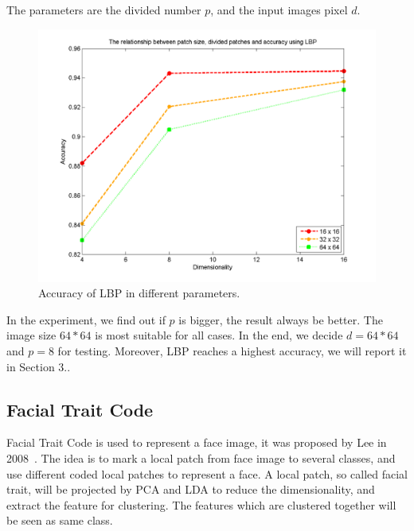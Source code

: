 \documentclass[10pt,twocolumn,letterpaper]{article}
\begin{document}
The parameters are the divided number $p$, and the input images pixel $d$.

\begin{figure}[t]
    \begin{center}
        \includegraphics[width=0.8\linewidth]{fig/lbp/lbp_par.png}
    \end{center}
    \caption{Accuracy of LBP in different parameters.}
    \label{fig:lbp_par}
\end{figure}

In the experiment, we find out if $p$ is bigger, the result always be better.
The image size $64*64$ is most suitable for all cases. In the end, we decide
$d=64*64$ and $p=8$ for testing. Moreover, LBP reaches a highest accuracy, 
we will report it in Section 3..


\subsection{Facial Trait Code}
Facial Trait Code is used to represent a face image, it was proposed
by Lee \etal in 2008~\cite{Lee2008}. The idea is to mark a local patch from face image
to several classes, and use different coded local patches to represent a face.
A local patch, so called facial trait, will be projected by PCA and LDA to 
reduce the dimensionality, and extract the feature for clustering. The
features which are clustered together will be seen as same class. 
\end{document}
